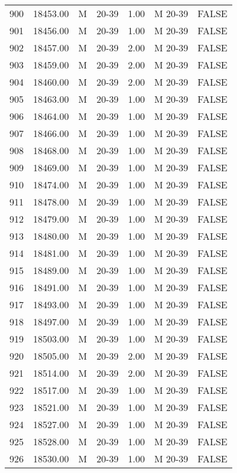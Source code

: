 \begin{table}[ht]
\begin{tabular}{rrllrll}
  900 & 18453.00 & M & 20-39 & 1.00 & M 20-39 & FALSE \\ 
  901 & 18456.00 & M & 20-39 & 1.00 & M 20-39 & FALSE \\ 
  902 & 18457.00 & M & 20-39 & 2.00 & M 20-39 & FALSE \\ 
  903 & 18459.00 & M & 20-39 & 2.00 & M 20-39 & FALSE \\ 
  904 & 18460.00 & M & 20-39 & 2.00 & M 20-39 & FALSE \\ 
  905 & 18463.00 & M & 20-39 & 1.00 & M 20-39 & FALSE \\ 
  906 & 18464.00 & M & 20-39 & 1.00 & M 20-39 & FALSE \\ 
  907 & 18466.00 & M & 20-39 & 1.00 & M 20-39 & FALSE \\ 
  908 & 18468.00 & M & 20-39 & 1.00 & M 20-39 & FALSE \\ 
  909 & 18469.00 & M & 20-39 & 1.00 & M 20-39 & FALSE \\ 
  910 & 18474.00 & M & 20-39 & 1.00 & M 20-39 & FALSE \\ 
  911 & 18478.00 & M & 20-39 & 1.00 & M 20-39 & FALSE \\ 
  912 & 18479.00 & M & 20-39 & 1.00 & M 20-39 & FALSE \\ 
  913 & 18480.00 & M & 20-39 & 1.00 & M 20-39 & FALSE \\ 
  914 & 18481.00 & M & 20-39 & 1.00 & M 20-39 & FALSE \\ 
  915 & 18489.00 & M & 20-39 & 1.00 & M 20-39 & FALSE \\ 
  916 & 18491.00 & M & 20-39 & 1.00 & M 20-39 & FALSE \\ 
  917 & 18493.00 & M & 20-39 & 1.00 & M 20-39 & FALSE \\ 
  918 & 18497.00 & M & 20-39 & 1.00 & M 20-39 & FALSE \\ 
  919 & 18503.00 & M & 20-39 & 1.00 & M 20-39 & FALSE \\ 
  920 & 18505.00 & M & 20-39 & 2.00 & M 20-39 & FALSE \\ 
  921 & 18514.00 & M & 20-39 & 2.00 & M 20-39 & FALSE \\ 
  922 & 18517.00 & M & 20-39 & 1.00 & M 20-39 & FALSE \\ 
  923 & 18521.00 & M & 20-39 & 1.00 & M 20-39 & FALSE \\ 
  924 & 18527.00 & M & 20-39 & 1.00 & M 20-39 & FALSE \\ 
  925 & 18528.00 & M & 20-39 & 1.00 & M 20-39 & FALSE \\ 
  926 & 18530.00 & M & 20-39 & 1.00 & M 20-39 & FALSE \\ 

\end{tabular}
\end{table}
